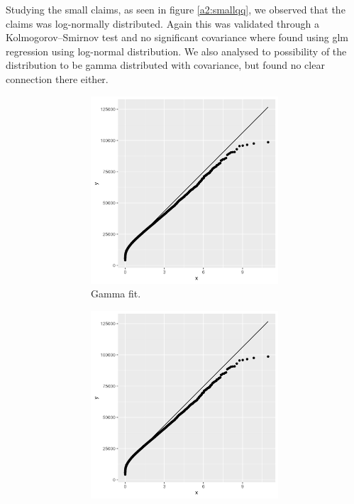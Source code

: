 \documentclass[11pt]{article}
\begin{document}
Studying the small claims, as seen in figure \ref{a2:smallqq}, we observed that the claims was log-normally distributed. 
Again this was validated through a Kolmogorov–Smirnov test and no significant covariance where found using glm regression using log-normal distribution.
We also analysed to possibility of the distribution to be gamma distributed with covariance, but found no clear connection there either.


\begin{figure}[!h]
\centering
\begin{subfigure}{.49\textwidth}
    \begin{subfigure}{.5\textwidth}
      \centering
      \includegraphics[width=.9\linewidth]{plots/claim_type1/qqplot_gamma_small.png}
      \caption{Gamma fit.}
    \end{subfigure}%
    \begin{subfigure}{.5\textwidth}
      \centering
      \includegraphics[width=.9\linewidth]{plots/claim_type1/qqplot_weibull_small.png}

\end{subfigure}
\end{subfigure}
\end{figure}
\end{document}
